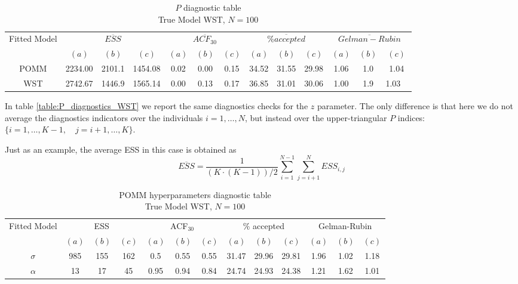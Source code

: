\documentclass[11pt]{amsart}
\begin{document}
\begin{table}[h]
\centering
\caption{
{\large $P$ diagnostic table} \\ 
{\small True Model WST, $N=100$}
} 
\begin{tabular}{ccccccccccccc}
\toprule
\multirow{2}{*}{Fitted Model} & \multicolumn{3}{c}{$\overline{ESS}$} & \multicolumn{3}{c}{
$\overline{ACF_{30}}$} & \multicolumn{3}{c}{$\overline{\% accepted}$} & \multicolumn{3}{c}{$\overline{Gelman-Rubin}$}\\
\cmidrule(lr){2-4} \cmidrule(lr){5-7} \cmidrule(lr){8-10} \cmidrule(lr){11-13} 
& $(a)$ & $(b)$ & $(c)$ & $(a)$ & $(b)$ & $(c)$ & $(a)$ & $(b)$ & $(c)$ & $(a)$ & $(b)$ & $(c)$ \\
\midrule
POMM & 2234.00 & 2101.1 & 1454.08 & 0.02 & 0.00 & 0.15 & 34.52 & 31.55 & 29.98 & 1.06 & 1.0 & 1.04  \\
WST &2742.67 & 1446.9 & 1565.14 & 0.00 & 0.13 & 0.17 & 36.85 & 31.01 & 30.06 & 1.00 & 1.9 & 1.03 \ \\
\bottomrule
\end{tabular}
\label{table:P_diagnostics_WST}
\end{table}


In table \eqref{table:P_diagnostics_WST} we report the same diagnostics checks for the $z$ parameter. The only difference is that here we do not average the diagnostics indicators over the individuals $i= 1,\ldots,N$, but instead over the upper-triangular $P$ indices: $\{ i =1,\ldots, K-1, \quad j = i+1, \ldots, K \}$.

Just as an example, the average ESS in this case is obtained as
$$
\overline{ESS} = \frac{1}{(K \cdot (K-1))/2} \sum_{i=1}^{N-1} \sum_{j=i+1}^N ESS_{i,j}
$$




\begin{table}[h]
\centering
\caption{
{\large POMM hyperparameters diagnostic table} \\ 
{\small True Model WST, $N=100$}
} 
\begin{tabular}{ccccccccccccc}
\toprule
\multirow{2}{*}{Fitted Model} & \multicolumn{3}{c}{ESS} & \multicolumn{3}{c}{
ACF$_{30}$} & \multicolumn{3}{c}{$\%$ accepted} & \multicolumn{3}{c}{Gelman-Rubin}\\
\cmidrule(lr){2-4} \cmidrule(lr){5-7} \cmidrule(lr){8-10} \cmidrule(lr){11-13} 
& $(a)$ & $(b)$ & $(c)$ & $(a)$ & $(b)$ & $(c)$ & $(a)$ & $(b)$ & $(c)$ & $(a)$ & $(b)$ & $(c)$ \\
\midrule
$\sigma$ &985 & 155 & 162 & 0.5 & 0.55 & 0.55 & 31.47 & 29.96 & 29.81 & 1.96 & 1.02 & 1.18 \\
$\alpha$ &13 & 17 & 45 & 0.95 & 0.94 & 0.84 & 24.74 & 24.93 & 24.38 & 1.21 & 1.62 & 1.01 \\
\bottomrule
\end{tabular}
\label{table:P_hyper_WST}
\end{table}
\end{document}
